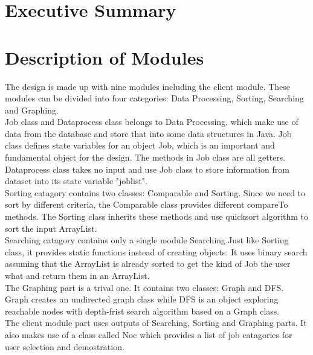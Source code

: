 \documentclass[12pt]{article}
\begin{document}
\newpage

\section*{Executive Summary}


\tableofcontents
\newpage

\section{Description of Modules}
The design is made up with nine modules including the client module. These modules can be divided into four categories: Data Processing, Sorting, Searching and Graphing.\\\newline Job class and Dataprocess class belongs to Data Processing, which make use of data from the database and store that into some data structures in Java. Job class defines state variables for an object Job, which is an important and fundamental object for the design. The methods in Job class are all getters. Dataprocess class takes no input and use Job class to store information from dataset into its state variable "joblist".\\\newline Sorting catagory contains two classes: Comparable and Sorting. Since we need to sort by different criteria, the Comparable class provides different compareTo methods. The Sorting class inherits these methods and use quicksort algorithm to sort the input ArrayList. \\\newline Searching catagory contains only a single module Searching.Just like Sorting class, it provides static functions instead of creating objects. It uses binary search assuming that the ArrayList is already sorted to get the kind of Job the user what and return them in an ArrayList. \\\newline The Graphing part is a trival one. It contains two classes: Graph and DFS. Graph creates an undirected graph class while DFS is an object exploring reachable nodes with depth-frist search algorithm based on a Graph class. \\\newline The client module part uses outputs of Searching, Sorting and Graphing parts. It also makes use of a class called Noc which provides a list of job catagories for user selection and demostration.
\end{document}
